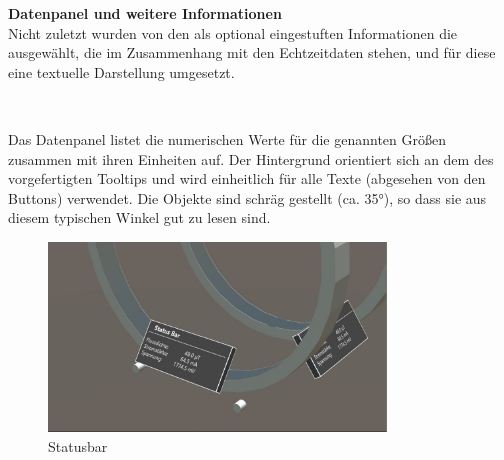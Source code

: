 \textbf{Datenpanel und weitere Informationen}\\
Nicht zuletzt wurden von den als optional eingestuften Informationen die ausgewählt, die im Zusammenhang mit den Echtzeitdaten stehen, und für diese eine textuelle Darstellung umgesetzt.
\vspace{4px}
\begin{center}
	\\
\end{center}
\vspace{6px}
Das Datenpanel listet die numerischen Werte für die genannten Größen zusammen mit ihren Einheiten auf. Der Hintergrund orientiert sich an dem des vorgefertigten Tooltips und wird einheitlich für alle Texte (abgesehen von den Buttons) verwendet. Die Objekte sind schräg gestellt (ca. 35°), so dass sie aus diesem typischen Winkel gut zu lesen sind.\\

\begin{figure}[H]
	\centering
	\includegraphics[width=0.8\textwidth]{images/status.jpg}
	\caption{Statusbar}
	\label{img:status}
\end{figure}

